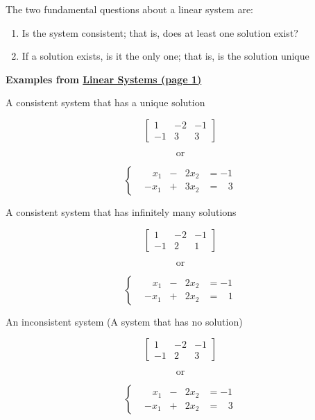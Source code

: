 \documentclass[
  letterpaper,
  DIV=11,
  numbers=noendperiod]{scrreprt}
\providecommand{\tightlist}{%
  \setlength{\itemsep}{0pt}\setlength{\parskip}{0pt}}\usepackage{longtable,booktabs,array}
\begin{document}

The two fundamental questions about a linear system are:

\begin{enumerate}
\def\labelenumi{\arabic{enumi}.}
\tightlist
\item
  Is the system consistent; that is, does at least one solution exist?
\item
  If a solution exists, is it the only one; that is, is the solution
  unique
\end{enumerate}

\textbf{Examples from \href{./p1.html}{Linear Systems (page 1)}}

A consistent system that has a unique solution

\[
\left[\begin{array}{cc|c}
1 & -2 & -1 \\
-1 & 3 & 3
\end{array}\right]
\]

\[
\text{or}
\]

\[
\begin{cases}
&\;\;\;x_1 &- &2x_2 &= -1 \\
&-x_1 &+ &3x_2 &= \;\;\;3
\end{cases}
\]

A consistent system that has infinitely many solutions

\[
\left[\begin{array}{cc|c}
1 & -2 & -1 \\
-1 & 2 & 1
\end{array}\right]  
\]

\[
\text{or}
\]

\[
\begin{cases}
&\;\;\;x_1 &- &2x_2 &= -1 \\
&-x_1 &+ &2x_2 &= \;\;\;1
\end{cases}
\]

An inconsistent system (A system that has no solution)

\[
\left[\begin{array}{cc|c}
1 & -2 & -1 \\
-1 & 2 & 3
\end{array}\right]
\]

\[
\text{or}
\]

\[
\begin{cases}
&\;\;\;x_1 &- &2x_2 &= -1 \\
&-x_1 &+ &2x_2 &= \;\;\;3
\end{cases}
\]
\end{document}
